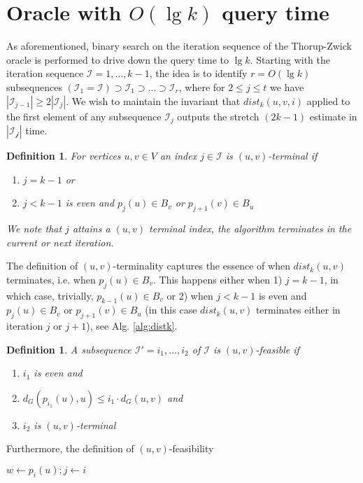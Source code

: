 \documentclass[12pt]{article}
\newtheorem{defi}[thm]{Definition}
\begin{document}
\section{Oracle with $O(\lg k)$ query time}
As aforementioned, binary search on the iteration sequence of the Thorup-Zwick oracle is performed to drive down the query time to $\lg k$. Starting with the iteration sequence $\mathcal{I}=1,\hdots,k-1$, the idea is to identify $r=O(\lg k)$ subsequences $(\mathcal{I}_1=\mathcal{I}) \supset \mathcal{I}_1 \supset \hdots \supset \mathcal{I}_r$, where for $2 \leq j \leq t$ we have $|\mathcal{I}_{j-1}| \geq 2|\mathcal{I}_j|$. We wish to maintain the invariant that $dist_k(u,v,i)$ applied to the first element of any subsequence $\mathcal{I}_j$ outputs the stretch $(2k-1)$ estimate in $|\mathcal{\mathcal{I}_j}|$ time.
\\
\begin{defi}
For vertices $u,v \in V$ an index $j \in \mathcal{I}$ is $(u,v)$-terminal if
\begin{enumerate}
\item $j = k-1$ or
\item $j < k-1$ is even and $p_j(u) \in B_v$ or $p_{j+1}(v) \in B_u$ 
\end{enumerate}
We note that $j$ attains a $(u,v)$ terminal index, the algorithm terminates in the current or next iteration. \label{def:uvterm}
\end{defi}
The definition of $(u,v)$-terminality captures the essence of when $dist_k(u,v)$ terminates, i.e. when $p_j(u) \in B_v$. This happens either when 1) $j=k-1$, in which case, trivially, $p_{k-1}(u) \in B_v$ or 2) when $j < k-1$ is even and $p_j(u) \in B_v$ or $p_{j+1}(v) \in B_u$ (in this case $dist_k(u,v)$ terminates either in iteration $j$ or $j+1$), see Alg. \ref{alg:distk}.
\\
\begin{defi}
A subsequence $\mathcal{I'}=i_1, \hdots, i_2$ of $\mathcal{I}$ is $(u,v)$-feasible if
\begin{enumerate}
\item $i_1$ is even and
\item $d_{G}(p_{i_1}(u),u) \leq i_1 \cdot d_G(u,v)$ and
\item $i_2$ is $(u,v)$-terminal
\end{enumerate}
\label{def:uvfeas}
\end{defi}
Furthermore, the definition of $(u,v)$-feasibility 

\begin{Walgo}[ht]{20pt}
  \DontPrintSemicolon
  \Indm
    \Indp
    \BlankLine
    $w \leftarrow p_i(u); j \leftarrow i$
    
    
    \caption{$dist_k(u,v,i)$}
    \label{alg:distk}
\end{Walgo}
\end{document}
